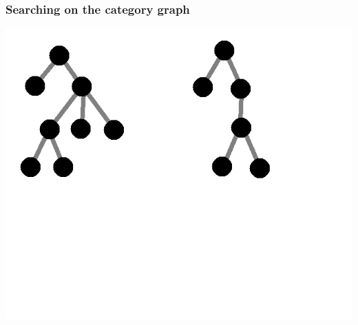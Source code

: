 \documentclass{beamer}
\begin{document}
\begin{frame}
\frametitle{Searching on the category graph}


  \includegraphics[height=0.8\textheight]{img/cats-1.png}

\end{frame}
\end{document}
